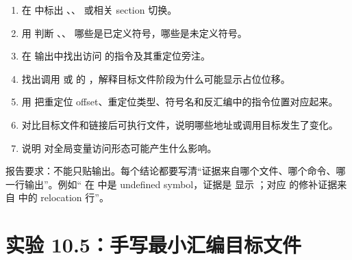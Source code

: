 \begin{labbox}
\begin{enumerate}
  \item 在  中标出 、、 或相关 section 切换。
  \item 用  判断 、、 哪些是已定义符号，哪些是未定义符号。
  \item 在  输出中找出访问  的指令及其重定位旁注。
  \item 找出调用  或  的 ，解释目标文件阶段为什么可能显示占位位移。
  \item 用  把重定位 offset、重定位类型、符号名和反汇编中的指令位置对应起来。
  \item 对比目标文件和链接后可执行文件，说明哪些地址或调用目标发生了变化。
  \item 说明  对全局变量访问形态可能产生什么影响。
\end{enumerate}

报告要求：不能只贴输出。每个结论都要写清“证据来自哪个文件、哪个命令、哪一行输出”。例如“ 在  中是 undefined symbol，证据是  显示 ；对应  的修补证据来自  中的 relocation 行”。
\end{labbox}

\section{实验 10.5：手写最小汇编目标文件}

